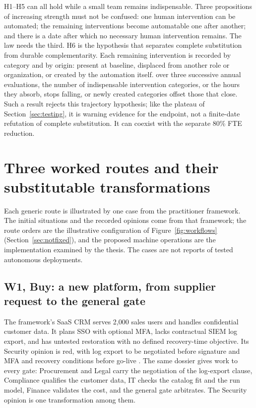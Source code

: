 H1--H5 can all hold while a small team remains indispensable. Three propositions of increasing strength
must not be confused: one human intervention can be automated; the remaining interventions become
automatable one after another; and there is a date after which no necessary human intervention remains.
The law needs the third. H6 is the hypothesis that separates complete substitution from durable
complementarity. Each remaining intervention is recorded
by category and by origin: present at baseline, displaced from another role or organization, or created
by the automation itself.
 over three successive annual evaluations, the number of indispensable
intervention categories, or the hours they absorb, stops falling, or newly created categories offset those that close. Such a result rejects this trajectory
hypothesis; like the plateau of Section~\ref{sec:testing}, it is warning evidence for the endpoint, not
a finite-date refutation of complete substitution. It can coexist with the separate 80\% FTE reduction.

\section{Three worked routes and their substitutable transformations}
\label{sec:routes-worked}

Each generic route is illustrated by one case from the practitioner framework. The initial situations
and the recorded opinions come from that framework; the route orders are the illustrative configuration
of Figure~\ref{fig:workflows} (Section~\ref{sec:notfixed}), and the proposed machine operations are the
implementation examined by the thesis. The cases are not reports of tested autonomous deployments.

\subsection{W1, Buy: a new platform, from supplier request to the general gate}

The framework's SaaS CRM serves 2,000 sales users and handles confidential customer data. It plans SSO
with optional MFA, lacks contractual SIEM log export, and has untested restoration with no defined
recovery-time objective. Its Security opinion is red, with log export to be negotiated before
signature and MFA and recovery conditions before go-live \citep[p.~103]{canale2026}. The same dossier
gives work to every gate: Procurement and Legal carry the negotiation of the log-export clause,
Compliance qualifies the customer data, IT checks the catalog fit and the run model, Finance validates the
cost, and the general gate arbitrates. The
Security opinion is one transformation among them.

